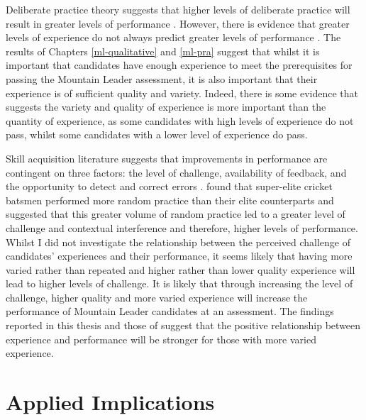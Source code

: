 \documentclass[
  12pt,
  a4paper,
]{book}
\begin{document}
Deliberate practice theory suggests that higher levels of deliberate practice will result in greater levels of performance \citep{Ericsson1993}. However, there is evidence that greater levels of experience do not always predict greater levels of performance \citep[see][ Section 4.1 for a review]{Rees2016}. The results of Chapters \ref{ml-qualitative} and \ref{ml-pra} suggest that whilst it is important that candidates have enough experience to meet the prerequisites for passing the Mountain Leader assessment, it is also important that their experience is of sufficient quality and variety. Indeed, there is some evidence that suggests the variety and quality of experience is more important than the quantity of experience, as some candidates with high levels of experience do not pass, whilst some candidates with a lower level of experience do pass.

Skill acquisition literature suggests that improvements in performance are contingent on three factors: the level of challenge, availability of feedback, and the opportunity to detect and correct errors \citep{Ericsson1993, Guadagnoll2004}. \citet{Jones2020} found that super-elite cricket batsmen performed more random practice than their elite counterparts and suggested that this greater volume of random practice led to a greater level of challenge and contextual interference and therefore, higher levels of performance. Whilst I did not investigate the relationship between the perceived challenge of candidates' experiences and their performance, it seems likely that having more varied rather than repeated and higher rather than lower quality experience will lead to higher levels of challenge. It is likely that through increasing the level of challenge, higher quality and more varied experience will increase the performance of Mountain Leader candidates at an assessment. The findings reported in this thesis and those of \citet{Jones2020} suggest that the positive relationship between experience and performance will be stronger for those with more varied experience.

\hypertarget{gen-discussion-applied-implications}{%
\section{Applied Implications}\label{gen-discussion-applied-implications}}
\end{document}
